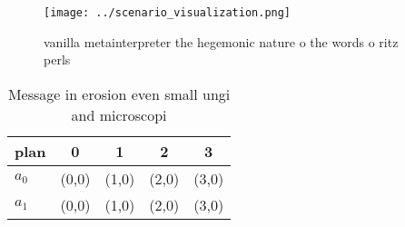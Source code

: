 \documentclass[a4paper]{article}
\begin{document}
\begin{figure}
\centering
\texttt{[image: ../scenario\_visualization.png]}
\caption{vanilla metainterpreter the hegemonic nature o the words o ritz perls
}
\end{figure}
 
\begin{table}
\begin{adjustbox}{width=0.7\columnwidth}
\begin{tabular}{|l|l|l|l|l|}
\hline
\textbf{plan} & \multicolumn{1}{c|}{\textbf{0}} & \multicolumn{1}{c|}{\textbf{1}} & \multicolumn{1}{c|}{\textbf{2}} & \multicolumn{1}{c|}{\textbf{3}} \\ \hline
\textbf{$a_0$}  & (0,0) & (1,0) & (2,0) & (3,0) \\ \hline
\textbf{$a_1$}  & (0,0) & (1,0) & (2,0) & (3,0) \\ \hline
\end{tabular}
\end{adjustbox}
\caption{Message in erosion even small ungi and microscopi
}
\end{table}
\end{document}
